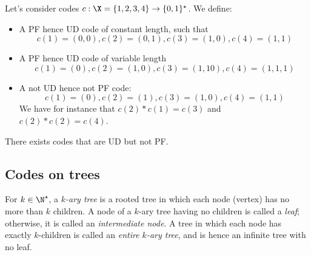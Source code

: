 \documentclass[toc, titlepaged]{../cs-classes/cs-classes}
\begin{document}
\begin{example}
    Let's consider codes $c: \X=\{1, 2, 3, 4\} \to \{0, 1\}^\star$. We define:
    \begin{itemize}
        \item A PF hence UD code of constant length, such that
        \begin{equation*}
            c(1) = (0, 0), c(2) = (0, 1), c(3) = (1, 0), c(4) = (1, 1)
        \end{equation*}
        \item A PF hence UD code of variable length
        \begin{equation*}
            c(1) = (0), c(2) = (1, 0), c(3) = (1, 1 0), c(4) = (1, 1, 1)
        \end{equation*}
        \item A not UD hence not PF code:
        \begin{equation*}
            c(1) = (0), c(2) = (1), c(3) = (1, 0), c(4) = (1, 1)
        \end{equation*}
        We have for instance that $c(2)*c(1)=c(3)$ and $c(2)*c(2)=c(4)$.
    \end{itemize}
\end{example}

\begin{property}
    There exists codes that are UD but not PF.
\end{property}

\subsection{Codes on trees}
\begin{definition}
    For $k\in\N^\star$, a \emph{$k$-ary tree} is a rooted tree in which each node (vertex) has no more than $k$ children. A node of a $k$-ary tree having no children is called a \emph{leaf}; otherwise, it is called an \emph{intermediate node}. A tree in which each node has exactly $k$-children is called an \emph{entire $k$-ary tree}, and is hence an infinite tree with no leaf.
\end{definition}
\end{document}
